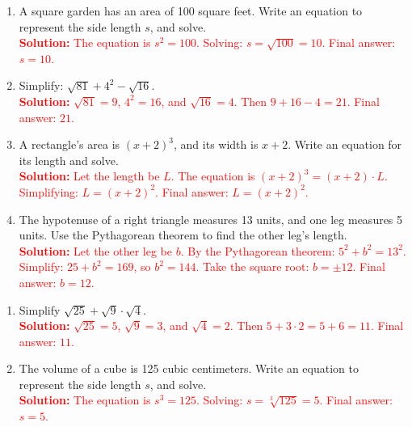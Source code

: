 \documentclass[10pt]{article}
\begin{document}
\vspace{1em}
\begin{tcolorbox}[colframe=black!60, colback=white, 
coltitle=black, colbacktitle=black!15, fonttitle=\bfseries\Large, 
title=Problems (Part 1), halign title=center, left=10pt, right=10pt, top=10pt, bottom=50pt]
\begin{enumerate}[itemsep=3em]
    \item A square garden has an area of 100 square feet. Write an equation to represent the side length \(s\), and solve.\\
    \textcolor{red}{\textbf{Solution:} The equation is \(s^2 = 100\). Solving: \(s = \sqrt{100} = 10\). Final answer: \(s = 10\).}

    \item Simplify: \( \sqrt{81} + 4^2 - \sqrt{16} \).\\
    \textcolor{red}{\textbf{Solution:} \( \sqrt{81} = 9\), \(4^2 = 16\), and \( \sqrt{16} = 4\). Then \(9 + 16 - 4 = 21\). Final answer: \(21\).}

    \item A rectangle's area is \((x+2)^3\), and its width is \(x+2\). Write an equation for its length and solve.\\
    \textcolor{red}{\textbf{Solution:} Let the length be \(L\). The equation is \((x+2)^3 = (x+2) \cdot L\). Simplifying: \(L = (x+2)^2\). Final answer: \(L = (x+2)^2\).}

    \item The hypotenuse of a right triangle measures 13 units, and one leg measures 5 units. Use the Pythagorean theorem to find the other leg's length.\\
    \textcolor{red}{\textbf{Solution:} Let the other leg be \(b\). By the Pythagorean theorem: \(5^2 + b^2 = 13^2\). Simplify: \(25 + b^2 = 169\), so \(b^2 = 144\). Take the square root: \(b = \pm 12\). Final answer: \(b = 12\).}
\end{enumerate}
\end{tcolorbox}

\vspace{1em}
\begin{tcolorbox}[colframe=black!60, colback=white, 
coltitle=black, colbacktitle=black!15, fonttitle=\bfseries\Large, 
title=Problems (Part 2), halign title=center, left=10pt, right=10pt, top=10pt, bottom=50pt]
\begin{enumerate}[start=5, itemsep=3em]
    \item Simplify \( \sqrt{25} + \sqrt{9} \cdot \sqrt{4} \).\\
    \textcolor{red}{\textbf{Solution:} \( \sqrt{25} = 5\), \( \sqrt{9} = 3\), and \( \sqrt{4} = 2\). Then \(5 + 3 \cdot 2 = 5 + 6 = 11\). Final answer: \(11\).}

    \item The volume of a cube is 125 cubic centimeters. Write an equation to represent the side length \(s\), and solve.\\
    \textcolor{red}{\textbf{Solution:} The equation is \(s^3 = 125\). Solving: \(s = \sqrt[3]{125} = 5\). Final answer: \(s = 5\).}
\end{enumerate}
\end{tcolorbox}
\end{document}
